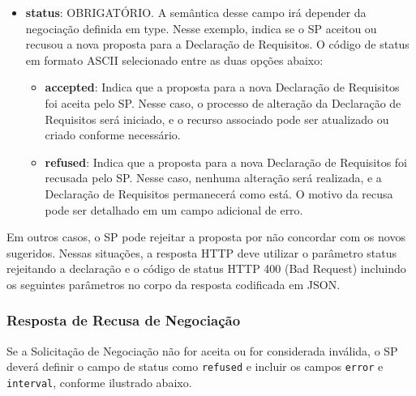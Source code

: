 

\begin{itemize}
    
   \item \textbf{status}: OBRIGATÓRIO. A semântica desse campo irá depender da negociação definida em type. Nesse exemplo, indica se o \acs{SP} aceitou ou recusou a nova proposta para a Declaração de Requisitos. O código de status em formato ASCII selecionado entre as duas opções abaixo:

    \begin{itemize}
        \item \textbf{accepted}: Indica que a proposta para a nova Declaração de Requisitos foi aceita pelo \acs{SP}. Nesse caso, o processo de alteração da Declaração de Requisitos será iniciado, e o recurso associado pode ser atualizado ou criado conforme necessário.
        
        \item \textbf{refused}: Indica que a proposta para a nova Declaração de Requisitos foi recusada pelo \acs{SP}. Nesse caso, nenhuma alteração será realizada, e a Declaração de Requisitos permanecerá como está. O motivo da recusa pode ser detalhado em um campo adicional de erro.
    \end{itemize}

\end{itemize}

Em outros casos, o \acs{SP} pode rejeitar a proposta por não concordar com os novos sugeridos. Nessas situações, a resposta HTTP deve utilizar o parâmetro status rejeitando a declaração e o código de status HTTP 400 (Bad Request) incluindo os seguintes parâmetros no corpo da resposta codificada em JSON.

\subsubsection*{Resposta de Recusa de Negociação}\label{subsubsection:response-negotiation-error}

Se a Solicitação de Negociação não for aceita ou for considerada inválida, o SP deverá definir o campo de status como \texttt{refused} e incluir os campos \texttt{error} e \texttt{interval}, conforme ilustrado abaixo.



